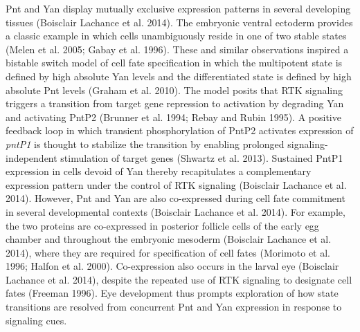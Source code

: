 Pnt and Yan display mutually exclusive expression patterns in several developing tissues (Boisclair Lachance et al. 2014). The embryonic ventral ectoderm provides a classic example in which cells unambiguously reside in one of two stable states (Melen et al. 2005; Gabay et al. 1996). These and similar observations inspired a bistable switch model of cell fate specification in which the multipotent state is defined by high absolute Yan levels and the differentiated state is defined by high absolute Pnt levels (Graham et al. 2010). The model posits that RTK signaling triggers a transition from target gene repression to activation by degrading Yan and activating PntP2 (Brunner et al. 1994; Rebay and Rubin 1995). A positive feedback loop in which transient phosphorylation of PntP2 activates expression of \textit{pntP1} is thought to stabilize the transition by enabling prolonged signaling-independent stimulation of target genes (Shwartz et al. 2013). Sustained PntP1 expression in cells devoid of Yan thereby recapitulates a complementary expression pattern under the control of RTK signaling (Boisclair Lachance et al. 2014). However, Pnt and Yan are also co-expressed during cell fate commitment in several developmental contexts (Boisclair Lachance et al. 2014). For example, the two proteins are co-expressed in posterior follicle cells of the early egg chamber and throughout the embryonic mesoderm (Boisclair Lachance et al. 2014), where they are required for specification of cell fates (Morimoto et al. 1996; Halfon et al. 2000). Co-expression also occurs in the larval eye (Boisclair Lachance et al. 2014), despite the repeated use of RTK signaling to designate cell fates (Freeman 1996). Eye development thus prompts exploration of how state transitions are resolved from concurrent Pnt and Yan expression in response to signaling cues.


